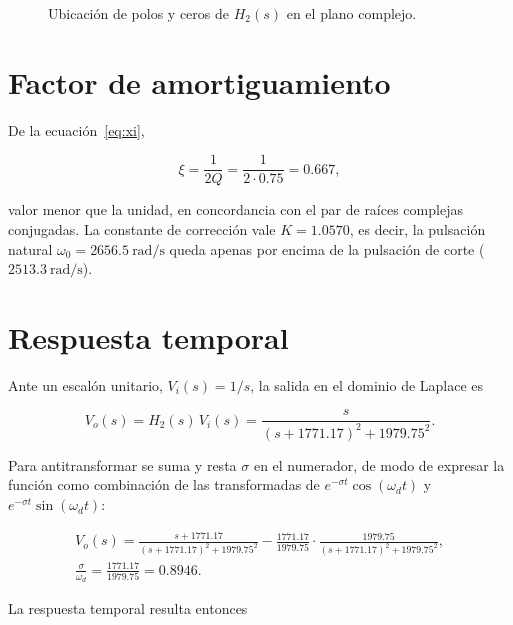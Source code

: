 \begin{figure}[!ht]
  \centering
  
  \caption{Ubicación de polos y ceros de $H_2(s)$ en el plano complejo.}
  \label{fig:polos-q075}
\end{figure}

\section{Factor de amortiguamiento}

De la ecuación~\eqref{eq:xi},

\begin{equation}
  \xi = \frac{1}{2Q} = \frac{1}{2 \cdot \num{0.75}} = \num{0.667},
  \label{eq:xi-q075}
\end{equation}

valor menor que la unidad, en concordancia con el par de raíces complejas conjugadas. La constante de
corrección vale $K = \num{1.0570}$, es decir, la pulsación natural
$\omega_0 = \qty{2656.5}{\radian\per\second}$ queda apenas por encima de la pulsación de corte
($\qty{2513.3}{\radian\per\second}$).

\section{Respuesta temporal}

Ante un escalón unitario, $V_i(s) = 1/s$, la salida en el dominio de Laplace es

\begin{equation}
  V_o(s) = H_2(s)\, V_i(s)
         = \frac{s}{\left(s + \num{1771.17}\right)^2 + \num{1979.75}^2}.
  \label{eq:vo-q075}
\end{equation}

Para antitransformar se suma y resta $\sigma$ en el numerador, de modo de expresar la función como
combinación de las transformadas de $e^{-\sigma t}\cos(\omega_d t)$ y $e^{-\sigma t}\sin(\omega_d t)$:

\begin{gather*}
  V_o(s) = \frac{s + \num{1771.17}}{\left(s + \num{1771.17}\right)^2 + \num{1979.75}^2}
         - \frac{\num{1771.17}}{\num{1979.75}} \cdot
           \frac{\num{1979.75}}{\left(s + \num{1771.17}\right)^2 + \num{1979.75}^2}, \\[4pt]
  \frac{\sigma}{\omega_d} = \frac{\num{1771.17}}{\num{1979.75}} = \num{0.8946}.
\end{gather*}

La respuesta temporal resulta entonces

